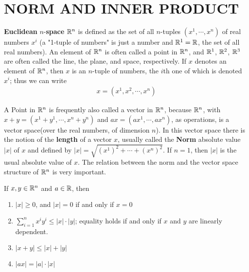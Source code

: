 \section{NORM AND INNER PRODUCT}
\textbf{Euclidean} $n$-\textbf{space} $\mathbb{R}^n$ is defined as the set of all
$n$-tuples $(x^1,\cdots,x^n)$ of real numbers $x^i$ (a "1-tuple of numbers" is 
just a number and $\mathbb{R}^1 = \mathbb{R}$, the set of all real numbers). 
An element of $\mathbb{R}^n$ is often called a point in $\mathbb{R}^n$, and $\mathbb{R}^1$, $\mathbb{R}^2$, $\mathbb{R}^3$
are often called the line, the plane, and space, respectively. 
If $x$ denotes an element of $\mathbb{R}^n$, then $x$ is an $n$-tuple of numbers, the
$i$th one of which is denoted $x^i$; thus we can write 
\begin{align*}
  x = (x^1, x^2, \cdots, x^n)
\end{align*}

A Point in $\mathbb{R}^n$ is frequently also called a vector in $\mathbb{R}^n$,
because $\mathbb{R}^n$, with $x+y = (x^1+y^1, \cdots, x^n+y^n)$ and $ax=(ax^1, \cdots, ax^n)$,
as operations, is a vector space(over the real numbers, of dimension $n$).
In this vector space there is the notion of the \textbf{length} of a vector $x$, usually 
called the \textbf{Norm} absolute value $|x|$ of $x$ and 
defined by $|x| = \sqrt{(x^1)^2 +\cdots + (x^n)^2}$. If $n=1$, then $|x|$ is the usual absolute 
value of $x$. The relation between the norm and the vector space structure of $\mathbb{R}^n$ is very 
important.

\begin{theorem}
  If $x, y \in \mathbb{R}^n$ and $a\in \mathbb{R}$, then 
  \begin{enumerate}[label={\upshape(\arabic*)}]
      \item $|x| \ge 0$, and $|x| = 0$ if and only if $x=0$ 
      \item $\sum_{i=1}^{n }{x^iy^i} \le |x|\cdot |y|$; equality holds if and only if 
        $x$ and $y$ are linearly dependent.
      \item $|x+y| \le |x| + |y|$
      \item $|ax| = |a|\cdot |x|$
  \end{enumerate}
\end{theorem}

